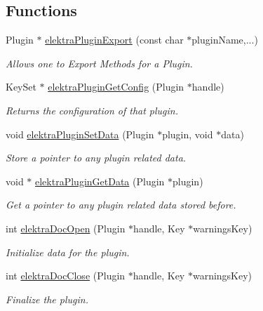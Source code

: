 \subsection*{Functions}
\begin{DoxyCompactItemize}
\item 
Plugin $\ast$ \hyperlink{group__plugin_ga8dd092048e972a3f0c9c9f54eb41576e}{elektra\+Plugin\+Export} (const char $\ast$plugin\+Name,...)
\begin{DoxyCompactList}\small\item\em Allows one to Export Methods for a Plugin. \end{DoxyCompactList}\item 
Key\+Set $\ast$ \hyperlink{group__plugin_ga644bead796506c172817724051c977c9}{elektra\+Plugin\+Get\+Config} (Plugin $\ast$handle)
\begin{DoxyCompactList}\small\item\em Returns the configuration of that plugin. \end{DoxyCompactList}\item 
void \hyperlink{group__plugin_gaf4b941a52ff55d0ca2a9158d90208ef2}{elektra\+Plugin\+Set\+Data} (Plugin $\ast$plugin, void $\ast$data)
\begin{DoxyCompactList}\small\item\em Store a pointer to any plugin related data. \end{DoxyCompactList}\item 
void $\ast$ \hyperlink{group__plugin_gaafcf3216b46292f222b8cc7828b4dd20}{elektra\+Plugin\+Get\+Data} (Plugin $\ast$plugin)
\begin{DoxyCompactList}\small\item\em Get a pointer to any plugin related data stored before. \end{DoxyCompactList}\item 
int \hyperlink{group__plugin_ga23c2eb3584e38a4d494eb8f91e5e3d8d}{elektra\+Doc\+Open} (Plugin $\ast$handle, Key $\ast$warnings\+Key)
\begin{DoxyCompactList}\small\item\em Initialize data for the plugin. \end{DoxyCompactList}\item 
int \hyperlink{group__plugin_ga1236aefe5b2baf8b7bf636ba5aa9ea29}{elektra\+Doc\+Close} (Plugin $\ast$handle, Key $\ast$warnings\+Key)
\begin{DoxyCompactList}\small\item\em Finalize the plugin. \end{DoxyCompactList}\item 

\end{DoxyCompactItemize}

